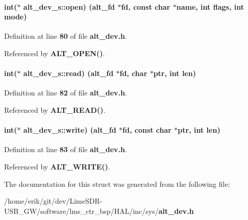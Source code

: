 \paragraph[{open}]{\setlength{\rightskip}{0pt plus 5cm}int($\ast$ alt\+\_\+dev\+\_\+s\+::open) ({\bf alt\+\_\+fd} $\ast$fd, const char $\ast${\bf name}, int flags, int mode)}\label{structalt__dev__s_a3d89f3d036af33d0309a6dfccd3e4d55}


Definition at line {\bf 80} of file {\bf alt\+\_\+dev.\+h}.



Referenced by {\bf A\+L\+T\+\_\+\+O\+P\+E\+N()}.

\paragraph[{read}]{\setlength{\rightskip}{0pt plus 5cm}int($\ast$ alt\+\_\+dev\+\_\+s\+::read) ({\bf alt\+\_\+fd} $\ast$fd, char $\ast$ptr, int len)}\label{structalt__dev__s_a56cb7704ff47c9dace02b388cbb4cbf5}


Definition at line {\bf 82} of file {\bf alt\+\_\+dev.\+h}.



Referenced by {\bf A\+L\+T\+\_\+\+R\+E\+A\+D()}.

\paragraph[{write}]{\setlength{\rightskip}{0pt plus 5cm}int($\ast$ alt\+\_\+dev\+\_\+s\+::write) ({\bf alt\+\_\+fd} $\ast$fd, const char $\ast$ptr, int len)}\label{structalt__dev__s_ac4ccf0e981dac6f02b01994cf331c17c}


Definition at line {\bf 83} of file {\bf alt\+\_\+dev.\+h}.



Referenced by {\bf A\+L\+T\+\_\+\+W\+R\+I\+T\+E()}.



The documentation for this struct was generated from the following file\+:\begin{DoxyCompactItemize}
\item 
/home/erik/git/dev/\+Lime\+S\+D\+R-\/\+U\+S\+B\+\_\+\+G\+W/software/lms\+\_\+ctr\+\_\+bsp/\+H\+A\+L/inc/sys/{\bf alt\+\_\+dev.\+h}\end{DoxyCompactItemize}
